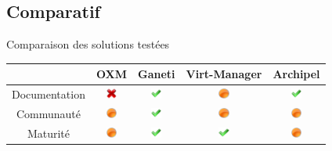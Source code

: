 \documentclass{beamer}
\begin{document}
\subsection{Comparatif}
\begin{frame}{Comparaison des solutions testées}
\begin{center}
\begin{tabular}{|c|c|c|c|c|}
\hline
 & OXM & Ganeti & Virt-Manager & Archipel \tabularnewline
\hline
Documentation & \includegraphics[width=10pt]{images_presentation/bad.png} & \includegraphics[width=10pt]{images_presentation/ok.png} & \includegraphics[width=10pt]{images_presentation/moyen.png} & \includegraphics[width=10pt]{images_presentation/ok.png} \tabularnewline
\hline
Communauté &\includegraphics[width=10pt]{images_presentation/moyen.png} & \includegraphics[width=10pt]{images_presentation/ok.png}& \includegraphics[width=10pt]{images_presentation/moyen.png}& \includegraphics[width=10pt]{images_presentation/moyen.png}\tabularnewline
\hline
Maturité &\includegraphics[width=10pt]{images_presentation/moyen.png}  & \includegraphics[width=10pt]{images_presentation/ok.png} & \includegraphics[width=10pt]{images_presentation/ok.png}& \includegraphics[width=10pt]{images_presentation/moyen.png} \tabularnewline

\end{tabular}
\end{center}
\end{frame}
\end{document}
